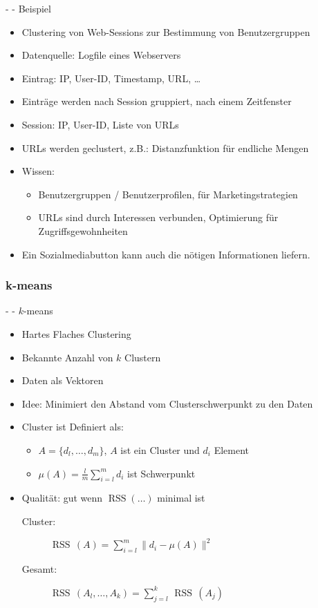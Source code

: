 \documentclass[fleqn,11pt,aspectratio=43]{beamer}
\DeclareMathOperator{\RSS}{RSS}
\begin{document}
\begin{frame}{\insertsectionhead - \insertsubsectionhead - Beispiel \cite{ester2000knowledge}}
\begin{itemize}
\item Clustering von Web-Sessions zur Bestimmung von Benutzergruppen
\item Datenquelle: Logfile eines Webservers
\item Eintrag: IP, User-ID, Timestamp, URL, \ldots
\item Einträge werden nach Session gruppiert, nach einem Zeitfenster
\item Session: IP, User-ID, Liste von URLs
\item URLs werden geclustert, z.B.: Distanzfunktion für endliche Mengen
\item Wissen:
\begin{itemize}
\item Benutzergruppen / Benutzerprofilen, für Marketingstrategien 
\item URLs sind durch Interessen verbunden, Optimierung für Zugriffsgewohnheiten 
\end{itemize}
\item Ein Sozialmediabutton kann auch die nötigen Informationen liefern.
\end{itemize}
\end{frame}


\subsubsection{k-means~}\label{kmeans}

\begin{frame}{\insertsectionhead - \insertsubsectionhead - $k$-means \cite{dwh}}
\begin{itemize}
\item Hartes Flaches Clustering
\item Bekannte Anzahl von $k$ Clustern
\item Daten als Vektoren
\item Idee: Minimiert den Abstand vom Clusterschwerpunkt zu den Daten
\item Cluster ist Definiert als:
\begin{itemize}
\item $A = \{d_l, \ldots, d_m\}$, $A$ ist ein Cluster und $d_i$ Element 
\item $\mu(A) = \frac{l}{m}\sum\limits_{i=l}^{m}{d_i}$ ist Schwerpunkt
\end{itemize}
\item Qualität: gut wenn $\RSS(\ldots)$ minimal ist
\begin{description}
\item[Cluster:] $\RSS\,(A) = \sum\limits_{i=l}^{m}\big\|d_i - \mu(A)\big\|^2$
\item[Gesamt:] $\RSS\,(A_l, \ldots, A_k) = \sum\limits_{j=l}^{k}\,\RSS\,(A_j)$
\end{description}
\end{itemize}
\end{frame}
\end{document}
